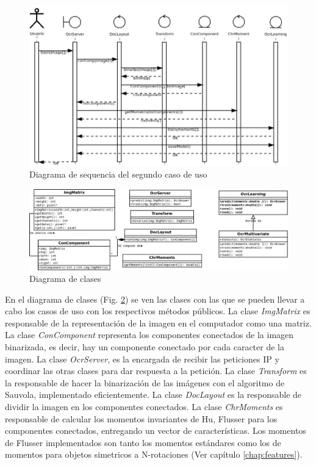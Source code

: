 \documentclass[a4paper, 11pt, oneside]{report}
\begin{document}
\begin{figure}
\begin{center}
\includegraphics[width=20cm]{diagrams/sequence2.jpeg}
\end{center}
\caption{Diagrama de sequencia del segundo caso de uso}
\label{fig:sequence2}
\end{figure}

\begin{figure}
\begin{center}
\includegraphics[width=20cm]{diagrams/clases.jpg}
\end{center}
\caption{Diagrama de clases}
\label{fig:classes}
\end{figure}

En el diagrama de clases (Fig. \ref{fig:classes}) se ven las clases con las que se pueden llevar a cabo los casos de uso con los respectivos métodos públicos. La clase {\it ImgMatrix} es responsable de la representación de la imagen en el computador como una matriz. La clase {\it ConComponent} representa los componentes conectados de la imagen binarizada, es decir, hay un componente conectado por cada caracter de la imagen. La clase {\it OcrServer}, es la encargada de recibir las peticiones IP y coordinar las otras clases para dar respuesta a la petición. La clase {\it Transform} es la responsable de hacer la binarización de las imágenes con el algoritmo de Sauvola, implementado eficientemente. La clase {\it DocLayout} es la responsable de dividir la imagen en los componentes conectados. La clase {\it ChrMoments} es responsable de calcular los momentos invariantes de Hu, Flusser para los componentes conectados, entregando un vector de características. Los momentos de Flusser implementados son tanto los momentos estándares como  los de momentos para objetos simetricos a N-rotaciones (Ver capítulo \ref{chap:features}).
\end{document}
